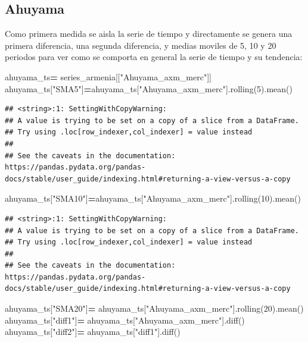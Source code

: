 \documentclass[
]{book}
\newenvironment{Shaded}{\begin{snugshade}}{\end{snugshade}}
\newcommand{\DecValTok}[1]{\textcolor[rgb]{0.00,0.00,0.81}{#1}}
\newcommand{\NormalTok}[1]{#1}
\newcommand{\OperatorTok}[1]{\textcolor[rgb]{0.81,0.36,0.00}{\textbf{#1}}}
\newcommand{\StringTok}[1]{\textcolor[rgb]{0.31,0.60,0.02}{#1}}
\begin{document}
\hypertarget{ahuyama}{%
\subsection{Ahuyama}\label{ahuyama}}

Como primera medida se aisla la serie de tiempo y directamente se genera una primera diferencia, una segunda diferencia, y medias moviles de 5, 10 y 20 periodos para ver como se comporta en general la serie de tiempo y su tendencia:

\begin{Shaded}
\begin{Highlighting}[]

\NormalTok{ahuyama\_ts}\OperatorTok{=}\NormalTok{ series\_armenia[[}\StringTok{"Ahuyama\_axm\_merc"}\NormalTok{]]}
\NormalTok{ahuyama\_ts[}\StringTok{"SMA5"}\NormalTok{]}\OperatorTok{=}\NormalTok{ahuyama\_ts[}\StringTok{"Ahuyama\_axm\_merc"}\NormalTok{].rolling(}\DecValTok{5}\NormalTok{).mean()}
\end{Highlighting}
\end{Shaded}

\begin{verbatim}
## <string>:1: SettingWithCopyWarning: 
## A value is trying to be set on a copy of a slice from a DataFrame.
## Try using .loc[row_indexer,col_indexer] = value instead
## 
## See the caveats in the documentation: https://pandas.pydata.org/pandas-docs/stable/user_guide/indexing.html#returning-a-view-versus-a-copy
\end{verbatim}

\begin{Shaded}
\begin{Highlighting}[]
\NormalTok{ahuyama\_ts[}\StringTok{"SMA10"}\NormalTok{]}\OperatorTok{=}\NormalTok{ahuyama\_ts[}\StringTok{"Ahuyama\_axm\_merc"}\NormalTok{].rolling(}\DecValTok{10}\NormalTok{).mean()}
\end{Highlighting}
\end{Shaded}

\begin{verbatim}
## <string>:1: SettingWithCopyWarning: 
## A value is trying to be set on a copy of a slice from a DataFrame.
## Try using .loc[row_indexer,col_indexer] = value instead
## 
## See the caveats in the documentation: https://pandas.pydata.org/pandas-docs/stable/user_guide/indexing.html#returning-a-view-versus-a-copy
\end{verbatim}

\begin{Shaded}
\begin{Highlighting}[]
\NormalTok{ahuyama\_ts[}\StringTok{"SMA20"}\NormalTok{]}\OperatorTok{=}\NormalTok{ ahuyama\_ts[}\StringTok{"Ahuyama\_axm\_merc"}\NormalTok{].rolling(}\DecValTok{20}\NormalTok{).mean()}
\NormalTok{ahuyama\_ts[}\StringTok{"diff1"}\NormalTok{]}\OperatorTok{=}\NormalTok{ ahuyama\_ts[}\StringTok{"Ahuyama\_axm\_merc"}\NormalTok{].diff()}
\NormalTok{ahuyama\_ts[}\StringTok{"diff2"}\NormalTok{]}\OperatorTok{=}\NormalTok{ ahuyama\_ts[}\StringTok{"diff1"}\NormalTok{].diff()}
\end{Highlighting}
\end{Shaded}
\end{document}
